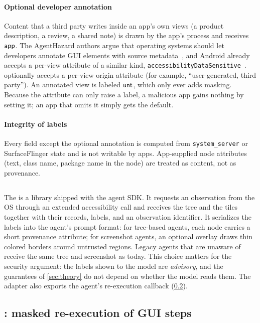 \paragraph{Optional developer annotation} Content that a third party writes inside an app's own views (a product description, a review, a shared note) is drawn by the app's process and receives $\textsf{app}$. The AgentHazard authors argue that operating systems should let developers annotate GUI elements with source metadata~\cite{liu2026agenthazard}, and Android already accepts a per-view attribute of a similar kind, \texttt{accessibilityDataSensitive}~\cite{android_blog_a11y_sensitive}. \PG{} optionally accepts a per-view origin attribute (for example, ``user-generated, third party''). An annotated view is labeled $\textsf{unt}$, which only ever adds masking. Because the attribute can only raise a label, a malicious app gains nothing by setting it; an app that omits it simply gets the default.

\paragraph{Integrity of labels} Every field except the optional annotation is computed from \texttt{system\_server} or SurfaceFlinger state and is not writable by apps. App-supplied node attributes (text, class name, package name in the node) are treated as content, not as provenance.

\subsection{\PA{}}\label{sec:design-adapter}

The \PA{} is a library shipped with the agent SDK. It requests an observation from the OS through an extended accessibility call and receives the tree and the tiles together with their records, labels, and an observation identifier. It serializes the labels into the agent's prompt format: for tree-based agents, each node carries a short provenance attribute; for screenshot agents, an optional overlay draws thin colored borders around untrusted regions. Legacy agents that are unaware of \PG{} receive the same tree and screenshot as today. This choice matters for the security argument: the labels shown to the model are \emph{advisory}, and the guarantees of \cref{sec:theory} do not depend on whether the model reads them. The adapter also exports the agent's re-execution callback (\cref{sec:design-gate}).

\subsection{\CG{}: masked re-execution of GUI steps}\label{sec:design-gate}

